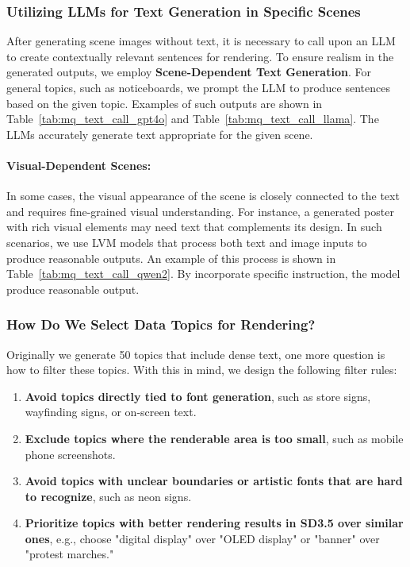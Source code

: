 






\subsubsection{Utilizing LLMs for Text Generation in Specific Scenes}


After generating scene images without text, it is necessary to call upon an LLM to create contextually relevant sentences for rendering. 
To ensure realism in the generated outputs, we employ \textbf{Scene-Dependent Text Generation}. 
For general topics, such as noticeboards, we prompt the LLM to produce sentences based on the given topic. 
Examples of such outputs are shown in Table~\ref{tab:mq_text_call_gpt4o} and Table~\ref{tab:mq_text_call_llama}.
The LLMs accurately generate text appropriate for the given scene.


\paragraph{Visual-Dependent Scenes:}  
In some cases, the visual appearance of the scene is closely connected to the text and requires fine-grained visual understanding. 
For instance, a generated poster with rich visual elements may need text that complements its design. 
In such scenarios, we use LVM models that process both text and image inputs to produce reasonable outputs. 
An example of this process is shown in Table~\ref{tab:mq_text_call_qwen2}.
By incorporate specific instruction, the model produce reasonable output.



\subsubsection{How Do We Select Data Topics for Rendering?}
Originally we generate 50 topics that include dense text, one more question is how to filter these topics.
With this in mind, we design the following filter rules:
\begin{enumerate}
    \item \textbf{Avoid topics directly tied to font generation}, such as store signs, wayfinding signs, or on-screen text.
    \item \textbf{Exclude topics where the renderable area is too small}, such as mobile phone screenshots.
    \item \textbf{Avoid topics with unclear boundaries or artistic fonts that are hard to recognize}, such as neon signs.
    \item \textbf{Prioritize topics with better rendering results in SD3.5 over similar ones}, e.g., choose "digital display" over "OLED display" or "banner" over "protest marches."
\end{enumerate}



